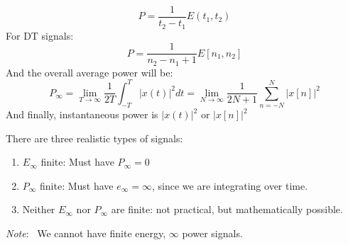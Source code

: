 \documentclass[nobib]{tufte-handout}
\newcommand{\note}[1]{
        \begin{notebox}
        \noindent\textit{Note}:\ #1
        \end{notebox}
}
\begin{document}
\begin{enumerate}
\begin{itemize}
\begin{equation*}
                        P = \frac{1}{t_2-t_1}E(t_1,t_2)
                    \end{equation*}
                    For DT signals:
                    \begin{equation*}
                        P = \frac{1}{n_2-n_1+1}E[n_1,n_2]
                    \end{equation*}
                    And the overall average power will be:\begin{equation*}
                        P_\infty = \lim_{T\rightarrow\infty}\frac{1}{2T}\int_{-T}^{T}|x(t)|^2 dt = \lim_{N\rightarrow\infty}\frac{1}{2N+1}\sum_{n=-N}^{N}|x[n]|^2
                    \end{equation*}
                    And finally, instantaneous power is $|x(t)|^2$ or $|x[n]|^2$
          \end{itemize}
          There are three realistic types of signals:\begin{enumerate}
              \item $E_\infty$ finite: Must have $P_\infty =0$
              \item $P_\infty$ finite: Must have $e_\infty = \infty$, since we are integrating over time.
              \item Neither $E_\infty$ nor $P_\infty$ are finite: not practical, but mathematically
                    possible.
          \end{enumerate}
          \note{ We cannot have finite energy, $\infty$ power signals.}

\end{enumerate}
\end{document}
